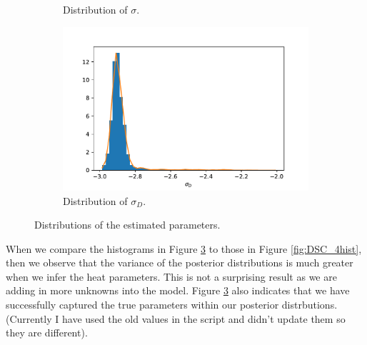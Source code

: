 \begin{figure}[h!]
\begin{subfigure}{.5\textwidth}
  \caption{Distribution of $\sigma$.}
  \label{fig:subhistTm1}
\end{subfigure}%
\begin{subfigure}{.5\textwidth}
  \centering
  \includegraphics[width=\linewidth]{figures/bayesian/SIM_Q/hist_sigmaD.pdf}
  \caption{Distribution of $\sigma_D$.}
  \label{fig:subhistTm2}
\end{subfigure}
    \caption{Distributions of the estimated parameters.}%
    \label{fig:DSC_8hist}%
\end{figure}%

When we compare the histograms in Figure \ref{fig:DSC_8hist} to those in Figure \ref{fig:DSC_4hist}, then we observe that the variance of the posterior distributions is much greater when we infer the heat parameters. This is not a surprising result as we are adding in more unknowns into the model. Figure \ref{fig:DSC_8hist} also indicates that we have successfully captured the true parameters within our posterior distrbutions. (Currently I have used the old values in the script and didn't update them so they are different).



